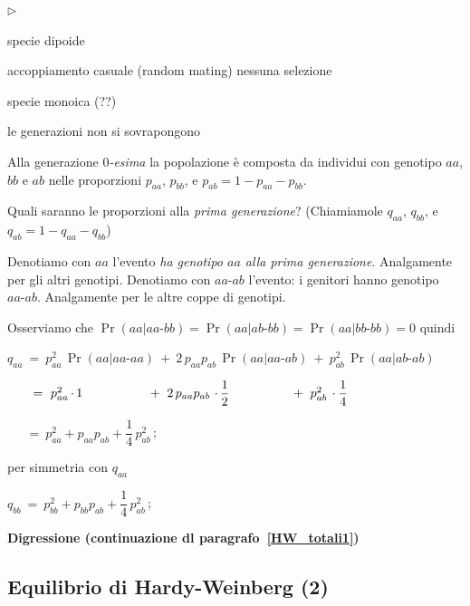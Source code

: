 \documentclass[12pt,openany]{book}
\newcommand{\mylabel}[1]{{\footnotesize\textsf{#1}}\hfill}
\newenvironment{citemize}
  {\begin{list}{$\triangleright$}{%
   \setlength{\parskip}{0mm}
   \setlength{\topsep}{.2\baselineskip}
   \setlength{\rightmargin}{0mm}
   \setlength{\listparindent}{0mm}
   \setlength{\itemindent}{0mm}
   \setlength{\labelwidth}{3ex}
   \setlength{\itemsep}{.1\baselineskip}
   \setlength{\parsep}{0mm}
   \setlength{\partopsep}{0mm}
   \setlength{\labelsep}{1ex}
   \setlength{\leftmargin}{\labelwidth+\labelsep}
   \let\makelabel\mylabel}}{%
   \end{list}\vspace*{-1.3mm}}
\theoremstyle{mio}
\theoremstyle{liscio}
\begin{document}
\begin{citemize}
\item specie dipoide
\item accoppiamento casuale (random mating) nessuna selezione
\item specie monoica (??)
\item le generazioni non si sovrapongono
\end{citemize}


Alla generazione \textit{$0$-esima\/} la popolazione è composta da individui con genotipo $aa$, $bb$ e $ab$ nelle proporzioni $p_{aa}$, $p_{bb}$, e  $p_{ab}=1-p_{aa}-p_{bb}$.

Quali saranno le proporzioni alla \textit{prima generazione}? (Chiamiamole $q_{aa}$, $q_{bb}$, e $q_{ab}=1-q_{aa}-q_{bb}$)

\def\-{\mbox{-}}

Denotiamo con $aa$ l'evento \textit{ha genotipo $aa$ alla prima generazione}. Analgamente per gli altri genotipi. Denotiamo con $aa\-ab$ l'evento: i genitori hanno genotipo $aa\mbox{-}ab$. Analgamente per le altre coppe di genotipi.

Osserviamo che $\Pr(aa | aa\-bb)=\Pr(aa | ab\-bb)=\Pr(aa | bb\-bb)=0$ quindi

$q_{aa}\ =\ %
p_{aa}^2\, \Pr(aa | aa\-aa)\ +\ 
2\,p_{aa}p_{ab}\, \Pr(aa | aa\-ab)\ +\ 
p^2_{ab}\, \Pr(aa | ab\-ab)$


$\phantom{q_{aa}}\ =\ %
p_{aa}^2\,\rlap{$\cdot\,1$}\phantom{\Pr(aa | aa,aa)}\ +\ 
2\,p_{aa}p_{ab}\, \rlap{$\,\cdot\,\dfrac12$}\ \phantom{\Pr(aa | aa\-ab)}\ +\ 
p^2_{ab}\, \cdot\dfrac14$ 

$\phantom{q_{aa}}\ =\ p_{aa}^2+p_{aa}p_{ab} +\dfrac{1}{4}\,p^2_{ab}\,$;

% 
% 
% 

per simmetria con $q_{aa}$

$q_{bb}\ =\ p_{bb}^2+p_{bb}p_{ab} +\dfrac{1}{4}\,p^2_{ab}\,$;


\hfill{}\clearpage\hfill\textbf{Digressione (continuazione dl paragrafo~\ref{HW_totali1})}\subsection{Equilibrio di Hardy-Weinberg (2)}
\end{document}
